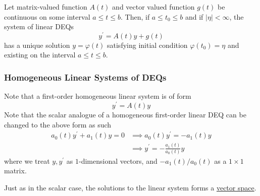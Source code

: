 \documentclass{article}
\newcounter{theorem}[section]
\begin{document}
    \begin{theorem}
      \label{thm:existence-of-unique-solutions-of-linear-systems}
    Let matrix-valued function $A(t)$ and vector valued function $g(t)$ be continuous on some interval $a \leq t \leq b$. Then, if $a\leq t_0 \leq b$ and if $|\eta| < \infty$, the system of linear DEQs
    \begin{equation}
      y^\prime = A(t) y + g(t)
    \end{equation}
    has a unique solution $y = \varphi(t)$ satisfying initial condition $\varphi(t_0) = \eta$ and existing on the interval $a \leq t \leq b$. 
    \end{theorem}

    \subsubsection{Homogeneous Linear Systems of DEQs}

      Note that a first-order homogeneous linear system is of form 
      \begin{equation}
        y^\prime = A(t) y
      \end{equation}
      Note that the scalar analogue of a homogeneous first-order linear DEQ can be changed to the above form as such 
      \begin{align*}
          a_0 (t) y^\prime + a_1 (t) y = 0 & \implies a_0 (t) y^\prime = - a_1 (t) y \\
          & \implies y^\prime = -\frac{a_1 (t)}{a_0 (t)} y
      \end{align*}
      where we treat $y, y^\prime$ as $1$-dimensional vectors, and $-a_1(t)/a_0 (t)$ as a $1 \times 1$ matrix. 

      Just as in the scalar case, the solutions to the linear system forms a \hyperref[lin-def:vector-space]{vector space}. 
\end{document}

